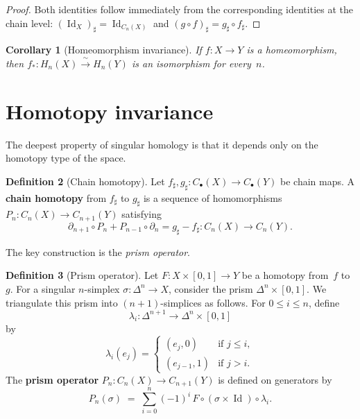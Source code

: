 \documentclass[12pt,a4paper,openany]{book}
\theoremstyle{definition}
\newtheorem{definition}{Definition}[chapter]
\theoremstyle{plain}
\newtheorem{corollary}[definition]{Corollary}
\theoremstyle{remark}
\DeclareMathOperator{\Id}{Id}
\begin{document}
\begin{proof}
Both identities follow immediately from the corresponding identities at the
chain level: $(\Id_X)_\sharp=\Id_{C_n(X)}$ and
$(g\circ f)_\sharp = g_\sharp\circ f_\sharp$.
\end{proof}

\begin{corollary}[Homeomorphism invariance]\label{cor:homeo-invariance}
If $f\colon X\to Y$ is a homeomorphism, then
$f_*\colon H_n(X)\xrightarrow{\;\sim\;} H_n(Y)$ is an isomorphism
for every~$n$.
\end{corollary}

\section{Homotopy invariance}\label{sec:homotopy-invariance}

The deepest property of singular homology is that it depends only on
the homotopy type of the space.

\begin{definition}[Chain homotopy]\label{def:chain-homotopy}
Let $f_\sharp,g_\sharp\colon C_\bullet(X)\to C_\bullet(Y)$ be chain maps.
A \textbf{chain homotopy} from $f_\sharp$ to $g_\sharp$ is a sequence of
homomorphisms $P_n\colon C_n(X)\to C_{n+1}(Y)$ satisfying
\[
  \partial_{n+1}\circ P_n + P_{n-1}\circ\partial_n
  = g_\sharp - f_\sharp
  \colon C_n(X)\to C_n(Y).
\]
\end{definition}

The key construction is the \emph{prism operator}.

\begin{definition}[Prism operator]\label{def:prism-operator}
Let $F\colon X\times[0,1]\to Y$ be a homotopy from~$f$ to~$g$.
For a singular $n$-simplex $\sigma\colon\Delta^n\to X$, consider the prism
$\Delta^n\times[0,1]$.  We triangulate this prism into $(n{+}1)$-simplices
as follows.  For $0\le i\le n$, define
\[
  \lambda_i\colon\Delta^{n+1}\to \Delta^n\times[0,1]
\]
by
\[
  \lambda_i(e_j) =
  \begin{cases}
    (e_j,0) & \text{if } j\le i,\\
    (e_{j-1},1) & \text{if } j > i.
  \end{cases}
\]
The \textbf{prism operator} $P_n\colon C_n(X)\to C_{n+1}(Y)$ is defined on
generators by
\[
  P_n(\sigma) \;=\; \sum_{i=0}^{n}(-1)^i\,F\circ(\sigma\times\Id)\circ\lambda_i.
\]
\end{definition}
\end{document}
